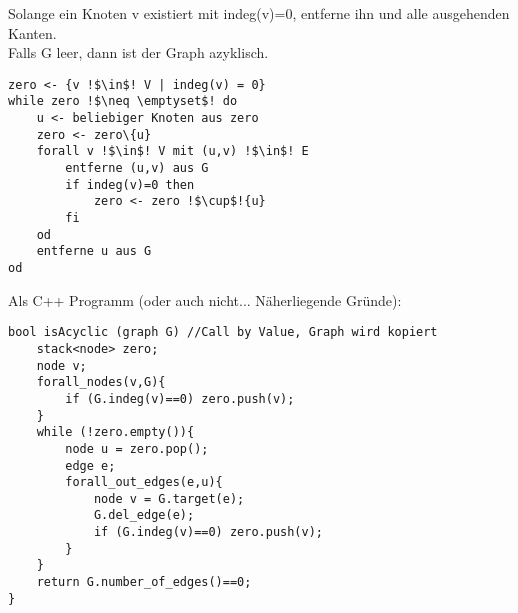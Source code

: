 \documentclass[a4paper]{article}
\begin{document}
\hspace*{1cm}Solange ein Knoten v existiert mit indeg(v)=0, entferne ihn und alle ausgehenden Kanten.\\
\hspace*{1cm}Falls G leer, dann ist der Graph azyklisch.
\begin{lstlisting}[escapechar=!]
zero <- {v !$\in$! V | indeg(v) = 0}
while zero !$\neq \emptyset$! do
	u <- beliebiger Knoten aus zero
	zero <- zero\{u}
	forall v !$\in$! V mit (u,v) !$\in$! E
		entferne (u,v) aus G
		if indeg(v)=0 then
			zero <- zero !$\cup$!{u}
		fi
	od
	entferne u aus G
od
\end{lstlisting}
Als C++ Programm (oder auch nicht... Näherliegende Gründe):
\begin{lstlisting}
bool isAcyclic (graph G) //Call by Value, Graph wird kopiert
	stack<node> zero;
	node v;
	forall_nodes(v,G){
		if (G.indeg(v)==0) zero.push(v);
	}
	while (!zero.empty()){
		node u = zero.pop();
		edge e;
		forall_out_edges(e,u){
			node v = G.target(e);
			G.del_edge(e);
			if (G.indeg(v)==0) zero.push(v);
		}
	}
	return G.number_of_edges()==0;
}
\end{lstlisting}
\end{document}
